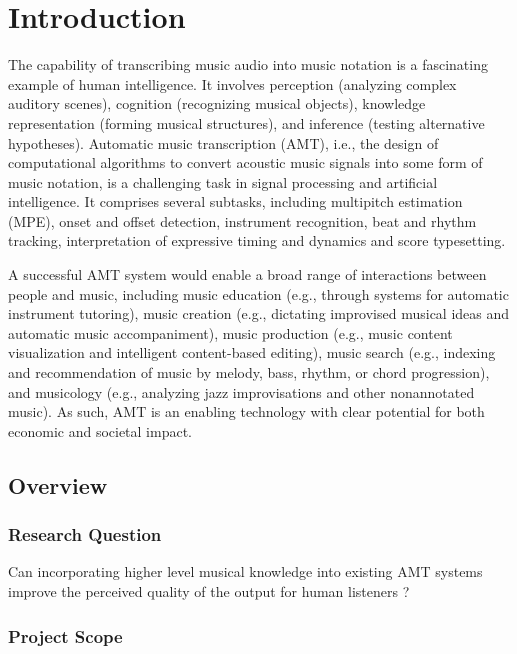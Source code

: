 
\chapter{Introduction}
\vspace{2em}

The capability of transcribing music audio into music notation is a fascinating example of human intelligence. It involves perception (analyzing complex auditory scenes), cognition (recognizing musical objects), knowledge representation (forming musical structures), and inference (testing alternative hypotheses). Automatic music transcription (AMT), i.e., the design of computational algorithms to convert acoustic music signals into some form of music notation, is a challenging task in signal processing and artificial intelligence. It comprises several subtasks, including multipitch estimation (MPE), onset and offset detection, instrument recognition, beat and rhythm tracking, interpretation of expressive timing and dynamics and score typesetting. 
\cite{amt2019:Benetos}

A successful AMT system would enable a broad range of interactions between people and music, including music education (e.g., through systems for automatic instrument tutoring), music creation (e.g., dictating improvised musical ideas and automatic music accompaniment), music production (e.g., music content visualization and intelligent content-based editing), music search (e.g., indexing and recommendation of music by melody, bass, rhythm, or chord progression), and musicology (e.g., analyzing jazz improvisations and other nonannotated music). As such, AMT is an enabling technology with clear potential for both economic and societal impact. \cite{amtfc2013:Benetos}

\section{Overview}

\subsection{Research Question}

Can incorporating higher level musical knowledge into existing AMT systems improve the perceived quality of the output for human listeners ? 

\subsection{Project Scope}

